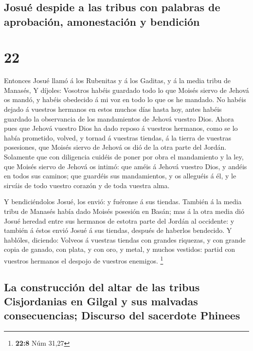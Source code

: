 \hypertarget{josuuxe9-despide-a-las-tribus-con-palabras-de-aprobaciuxf3n-amonestaciuxf3n-y-bendiciuxf3n}{%
\subsection{Josué despide a las tribus con palabras de aprobación,
amonestación y
bendición}\label{josuuxe9-despide-a-las-tribus-con-palabras-de-aprobaciuxf3n-amonestaciuxf3n-y-bendiciuxf3n}}

\hypertarget{section-21}{%
\section{22}\label{section-21}}

 Entonces Josué llamó á los Rubenitas y á los Gaditas, y á
la media tribu de Manasés,  Y díjoles: Vosotros habéis
guardado todo lo que Moisés siervo de Jehová os mandó, y habéis
obedecido á mi voz en todo lo que os he mandado.  No
habéis dejado á vuestros hermanos en estos muchos días hasta hoy, antes
habéis guardado la observancia de los mandamientos de Jehová vuestro
Dios.  Ahora pues que Jehová vuestro Dios ha dado reposo á
vuestros hermanos, como se lo había prometido, volved, y tornad á
vuestras tiendas, á la tierra de vuestras posesiones, que Moisés siervo
de Jehová os dió de la otra parte del Jordán.  Solamente
que con diligencia cuidéis de poner por obra el mandamiento y la ley,
que Moisés siervo de Jehová os intimó: que améis á Jehová vuestro Dios,
y andéis en todos sus caminos; que guardéis sus mandamientos, y os
alleguéis á él, y le sirváis de todo vuestro corazón y de toda vuestra
alma.

 Y bendiciéndolos Josué, los envió: y fuéronse á sus
tiendas.  También á la media tribu de Manasés había dado
Moisés posesión en Basán; mas á la otra media dió Josué heredad entre
sus hermanos de estotra parte del Jordán al occidente: y también á éstos
envió Josué á sus tiendas, después de haberlos bendecido. 
Y hablóles, diciendo: Volveos á vuestras tiendas con grandes riquezas, y
con grande copia de ganado, con plata, y con oro, y metal, y muchos
vestidos: partid con vuestros hermanos el despojo de vuestros enemigos.
\footnote{\textbf{22:8} Núm 31,27}

\hypertarget{la-construcciuxf3n-del-altar-de-las-tribus-cisjordanias-en-gilgal-y-sus-malvadas-consecuencias-discurso-del-sacerdote-phinees}{%
\subsection{La construcción del altar de las tribus Cisjordanias en
Gilgal y sus malvadas consecuencias; Discurso del sacerdote
Phinees}\label{la-construcciuxf3n-del-altar-de-las-tribus-cisjordanias-en-gilgal-y-sus-malvadas-consecuencias-discurso-del-sacerdote-phinees}}


